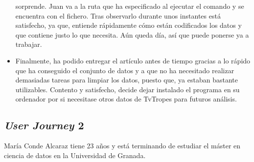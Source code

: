 \begin{itemize}
    sorprende. Juan va a la ruta que ha especificado al ejecutar el comando y se
    encuentra con el fichero. Tras observarlo durante unos instantes está
    satisfecho, ya que, entiende rápidamente cómo están codificados los datos y
    que contiene justo lo que necesita. Aún queda día, así que puede ponerse ya
    a trabajar. 
    \item Finalmente, ha podido entregar el artículo antes de tiempo gracias a
    lo rápido que ha conseguido el conjunto de datos y a que no ha necesitado
    realizar demasiadas tareas para limpiar los datos, puesto que, ya estaban
    bastante utilizables. Contento y satisfecho, decide dejar instalado el
    programa en su ordenador por si necesitase otros datos de TvTropes para
    futuros análisis.
\end{itemize}

\subsection{\textit{User Journey} 2}

María Conde Alcaraz tiene 23 años y está terminando de estudiar el máster en
ciencia de datos en la Universidad de Granada.

